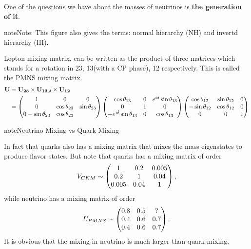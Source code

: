 \documentclass[letterpaper,12pt,english]{sphinxmanual}
\begin{document}
One of the questions we have about the masses of neutrinos is \textbf{the generation of it}.

\begin{notice}{note}{Note:}
This figure also gives the terms: normal hierarchy (NH) and invertd hierarchy (IH).
\end{notice}

Lepton mixing matrix, can be written as the product of three matrices which stands for a rotation in 23, 13(with a CP phase), 12 respectively. This is called the PMNS mixing matrix.
\begin{gather}
\begin{split}\mathbf U &= \mathbf {U_{23}} \times \mathbf {U_{13,\delta}} \times \mathbf {U_{12}} \\
& = \begin{pmatrix} 1 & 0 & 0 \\ 0 &\cos\theta_{23} & \sin\theta_{23} \\ 0 -\sin\theta_{23} & \cos\theta_{23} \end{pmatrix}  \begin{pmatrix} \cos\theta_{13} & 0 & e^{i\delta} \sin\theta_{13} \\ 0 & 1 & 0 \\ -e^{i\delta}\sin\theta_{13} & 0 & \cos\theta_{13}  \end{pmatrix} \begin{pmatrix} \cos\theta_{12} & \sin\theta_{12} & 0 \\ -\sin\theta_{12} & \cos \theta_{12} & 0 \\ 0 & 0 & 1 \end{pmatrix}\end{split}\notag
\end{gather}
\begin{notice}{note}{Neutrino Mixing vs Quark Mixing}

In fact that quarks also has a mixing matrix that mixes the mass eigenstates to produce flavor states. But note that quarks has a mixing matrix of order
\begin{gather}
\begin{split}V_{CKM}\sim \begin{pmatrix}
1 & 0.2 & 0.005 \\
0.2 & 1 & 0.04 \\
0.005 & 0.04 & 1
\end{pmatrix},\end{split}\notag
\end{gather}
while  neutrino has a mixing matrix of order
\begin{gather}
\begin{split}U_{PMNS} \sim \begin{pmatrix}
0.8 & 0.5 & ? \\
0.4 & 0.6 & 0.7 \\
0.4 & 0.6 & 0.7
\end{pmatrix}.\end{split}\notag
\end{gather}
It is obvious that the mixing in neutrino is much larger than quark mixing.
\end{notice}
\end{document}
